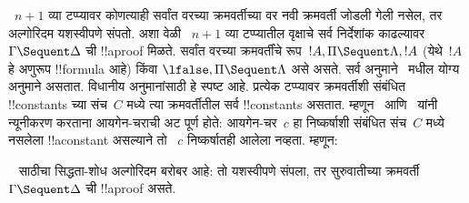 \documentclass[../../../include/open-logic-section]{subfiles}
\begin{document}
~$n+1$ व्या टप्प्यावर कोणत्याही सर्वांत वरच्या
क्रमवर्तीच्या वर नवी क्रमवर्ती जोडली गेली नसेल,
तर अल्गोरिदम यशस्वीपणे संपतो. अशा वेळी
~$n+1$ व्या टप्प्यातील वृक्षाचे सर्व निर्देशांक
काढल्यावर~$\Gamma \Sequent \Delta$ ची
!!a{proof} मिळते. सर्वांत वरच्या क्रमवर्तींचे
रूप~$!A, \Pi \Sequent \Lambda, !A$ (येथे~$!A$ हे अणुरूप !!{formula} आहे) किंवा
$\lfalse, \Pi \Sequent \Lambda$ असे असते.
सर्व अनुमाने~ मधील योग्य अनुमाने असतात.
विधानीय अनुमानांसाठी हे स्पष्ट आहे. प्रत्येक
टप्प्यावर क्रमवर्तीशी संबंधित !!{constant}s च्या
संच~$C$ मध्ये त्या क्रमवर्तीतील सर्व !!{constant}s असतात.
म्हणून~\LeftR{\lexists} आणि~\RightR{\lforall}
यांनी न्यूनीकरण करताना आयगेन-चराची अट पूर्ण होते:
आयगेन-चर~$c$ हा निष्कर्षाशी संबंधित संच~$C$
मध्ये नसलेला !!a{constant} असल्याने तो
~$c$ निष्कर्षातही आलेला नव्हता. म्हणून:

\begin{prop}
~ साठीचा सिद्धता-शोध अल्गोरिदम बरोबर आहे:
तो यशस्वीपणे संपला, तर सुरुवातीच्या
क्रमवर्ती~$\Gamma \Sequent \Delta$ ची
!!a{proof} असते.
\end{prop}
\end{document}
